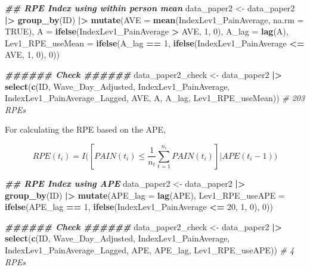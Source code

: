 \documentclass[
  12pt,
]{article}
\newenvironment{Shaded}{\begin{snugshade}}{\end{snugshade}}
\newcommand{\AttributeTok}[1]{\textcolor[rgb]{0.13,0.29,0.53}{#1}}
\newcommand{\CommentTok}[1]{\textcolor[rgb]{0.56,0.35,0.01}{\textit{#1}}}
\newcommand{\ConstantTok}[1]{\textcolor[rgb]{0.56,0.35,0.01}{#1}}
\newcommand{\DecValTok}[1]{\textcolor[rgb]{0.00,0.00,0.81}{#1}}
\newcommand{\DocumentationTok}[1]{\textcolor[rgb]{0.56,0.35,0.01}{\textbf{\textit{#1}}}}
\newcommand{\FunctionTok}[1]{\textcolor[rgb]{0.13,0.29,0.53}{\textbf{#1}}}
\newcommand{\NormalTok}[1]{#1}
\newcommand{\OtherTok}[1]{\textcolor[rgb]{0.56,0.35,0.01}{#1}}
\newcommand{\SpecialCharTok}[1]{\textcolor[rgb]{0.81,0.36,0.00}{\textbf{#1}}}
\begin{document}
\begin{Shaded}
\begin{Highlighting}[]
\DocumentationTok{\#\# RPE Index using within person mean}
\NormalTok{data\_paper2 }\OtherTok{\textless{}{-}}\NormalTok{ data\_paper2 }\SpecialCharTok{|\textgreater{}}
  \FunctionTok{group\_by}\NormalTok{(ID) }\SpecialCharTok{|\textgreater{}}
  \FunctionTok{mutate}\NormalTok{(}\AttributeTok{AVE =} \FunctionTok{mean}\NormalTok{(IndexLev1\_PainAverage, }\AttributeTok{na.rm =} \ConstantTok{TRUE}\NormalTok{),}
         \AttributeTok{A =} \FunctionTok{ifelse}\NormalTok{(IndexLev1\_PainAverage }\SpecialCharTok{\textgreater{}}\NormalTok{ AVE, }\DecValTok{1}\NormalTok{, }\DecValTok{0}\NormalTok{),}
         \AttributeTok{A\_lag =} \FunctionTok{lag}\NormalTok{(A),}
         \AttributeTok{Lev1\_RPE\_useMean =} \FunctionTok{ifelse}\NormalTok{(A\_lag }\SpecialCharTok{==} \DecValTok{1}\NormalTok{, }
                                   \FunctionTok{ifelse}\NormalTok{(IndexLev1\_PainAverage }\SpecialCharTok{\textless{}=}\NormalTok{ AVE, }\DecValTok{1}\NormalTok{, }\DecValTok{0}\NormalTok{), }\DecValTok{0}\NormalTok{)) }

\DocumentationTok{\#\#\#\#\#\# Check \#\#\#\#\#\#}
\NormalTok{data\_paper2\_check }\OtherTok{\textless{}{-}}\NormalTok{ data\_paper2 }\SpecialCharTok{|\textgreater{}}
  \FunctionTok{select}\NormalTok{(}\FunctionTok{c}\NormalTok{(ID, Wave\_Day\_Adjusted, IndexLev1\_PainAverage, IndexLev1\_PainAverage\_Lagged, }
\NormalTok{           AVE, A, A\_lag, Lev1\_RPE\_useMean))}
\CommentTok{\# 203 RPEs}
\end{Highlighting}
\end{Shaded}

For calculating the RPE based on the APE,

\[
RPE(t_i)=I\Big([PAIN(t_i)\leq \frac{1}{n_t}\sum_{t=1}^{n_i}PAIN(t_i)]|APE(t_i-1)\Big)
\]

\begin{Shaded}
\begin{Highlighting}[]
\DocumentationTok{\#\# RPE Index using APE}
\NormalTok{data\_paper2 }\OtherTok{\textless{}{-}}\NormalTok{ data\_paper2 }\SpecialCharTok{|\textgreater{}}
  \FunctionTok{group\_by}\NormalTok{(ID) }\SpecialCharTok{|\textgreater{}}
  \FunctionTok{mutate}\NormalTok{(}\AttributeTok{APE\_lag =} \FunctionTok{lag}\NormalTok{(APE), }
         \AttributeTok{Lev1\_RPE\_useAPE =} \FunctionTok{ifelse}\NormalTok{(APE\_lag }\SpecialCharTok{==} \DecValTok{1}\NormalTok{, }
                                   \FunctionTok{ifelse}\NormalTok{(IndexLev1\_PainAverage }\SpecialCharTok{\textless{}=} \DecValTok{20}\NormalTok{, }\DecValTok{1}\NormalTok{, }\DecValTok{0}\NormalTok{), }\DecValTok{0}\NormalTok{)) }

\DocumentationTok{\#\#\#\#\#\# Check \#\#\#\#\#\#}
\NormalTok{data\_paper2\_check }\OtherTok{\textless{}{-}}\NormalTok{ data\_paper2 }\SpecialCharTok{|\textgreater{}}
  \FunctionTok{select}\NormalTok{(}\FunctionTok{c}\NormalTok{(ID, Wave\_Day\_Adjusted, IndexLev1\_PainAverage, IndexLev1\_PainAverage\_Lagged, }
\NormalTok{           APE, APE\_lag, Lev1\_RPE\_useAPE))}
\CommentTok{\# 4 RPEs}
\end{Highlighting}
\end{Shaded}
\end{document}
